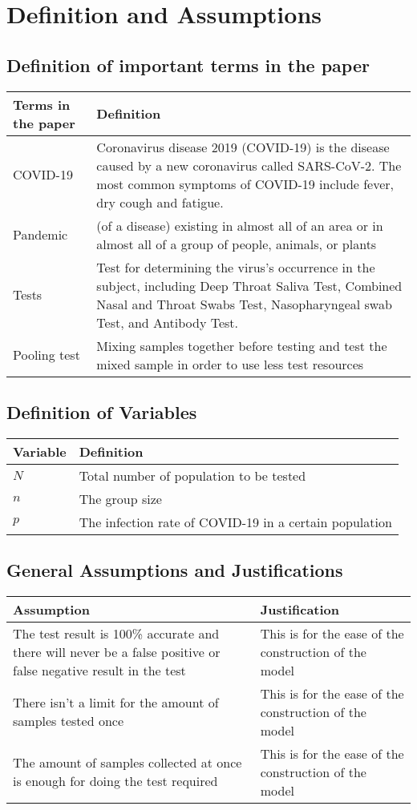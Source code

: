 \section{Definition and Assumptions}

\subsection{Definition of important terms in the paper}
\begin{tabular}{p{5cm}p{12cm}}
\toprule
\textbf{Terms in the paper}&\textbf{Definition}\\
\toprule
COVID-19&Coronavirus disease 2019 (COVID-19) is the disease caused by a new coronavirus called SARS-CoV-2. The most common symptoms of COVID-19 include fever, dry cough and fatigue.\cite{covid19def}\\
\midrule
Pandemic&(of a disease) existing in almost all of an area or in almost all of a group of people, animals, or plants\cite{pandemicdef}\\
\midrule
Tests&Test for determining the virus's occurrence in the subject, including Deep Throat Saliva Test, Combined Nasal and Throat Swabs Test, Nasopharyngeal swab Test, and Antibody Test.\cite{testsdef}\\
\midrule
Pooling test&Mixing samples together before testing and test the mixed sample in order to use less test resources\cite{pooldef}\\
\bottomrule
\end{tabular}

\subsection{Definition of Variables}
\begin{tabular}{p{5cm}p{12cm}}
\toprule
\textbf{Variable}&\textbf{Definition}\\
\toprule
$N$&Total number of population to be tested\\
\midrule
$n$&The group size\\
\midrule
$p$&The infection rate of COVID-19 in a certain population\\
\bottomrule
\end{tabular}

\subsection{General Assumptions and Justifications}
\begin{tabular}{p{8.5cm}p{8.5cm}}
\toprule
\textbf{Assumption}&\textbf{Justification}\\
\toprule
The test result is 100\% accurate and there will never be a false positive or false negative result in the test&This is for the ease of the construction of the model\\
\midrule
There isn't a limit for the amount of samples tested once&This is for the ease of the construction of the model\\
\midrule
The amount of samples collected at once is enough for doing the test required&This is for the ease of the construction of the model\\
\bottomrule
\end{tabular}